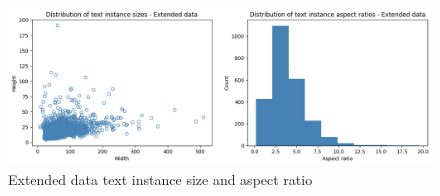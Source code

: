 \begin{appendices}
\begin{figure}[H]
    \centering
    \includegraphics[width=\textwidth]{media/methodology/pano_ins_sz.png}
    \caption{Extended data text instance size and aspect ratio}
    \label{fig:pano_ins_sz}
\end{figure}


\end{appendices}
